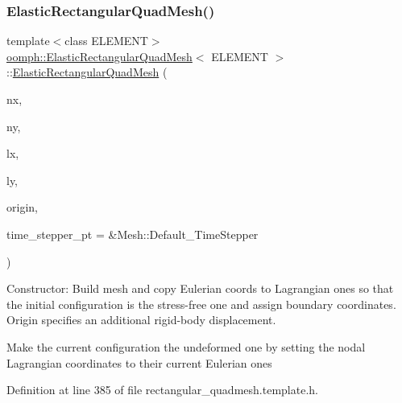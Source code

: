 \subsubsection{\texorpdfstring{Elastic\+Rectangular\+Quad\+Mesh()}{ElasticRectangularQuadMesh()}\hspace{0.1cm}{\footnotesize\ttfamily [1/3]}}
{\footnotesize\ttfamily template$<$class E\+L\+E\+M\+E\+NT$>$ \\
\hyperlink{classoomph_1_1ElasticRectangularQuadMesh}{oomph\+::\+Elastic\+Rectangular\+Quad\+Mesh}$<$ E\+L\+E\+M\+E\+NT $>$\+::\hyperlink{classoomph_1_1ElasticRectangularQuadMesh}{Elastic\+Rectangular\+Quad\+Mesh} (\begin{DoxyParamCaption}\item[{const unsigned \&}]{nx,  }\item[{const unsigned \&}]{ny,  }\item[{const double \&}]{lx,  }\item[{const double \&}]{ly,  }\item[{const Vector$<$ double $>$ \&}]{origin,  }\item[{Time\+Stepper $\ast$}]{time\+\_\+stepper\+\_\+pt = {\ttfamily \&Mesh\+:\+:Default\+\_\+TimeStepper} }\end{DoxyParamCaption})\hspace{0.3cm}{\ttfamily [inline]}}



Constructor\+: Build mesh and copy Eulerian coords to Lagrangian ones so that the initial configuration is the stress-\/free one and assign boundary coordinates. Origin specifies an additional rigid-\/body displacement. 

Make the current configuration the undeformed one by setting the nodal Lagrangian coordinates to their current Eulerian ones 

Definition at line 385 of file rectangular\+\_\+quadmesh.\+template.\+h.

\mbox{\label{classoomph_1_1ElasticRectangularQuadMesh_a57b701739dcc5c643a1a9bae94a4b7d8}} 
